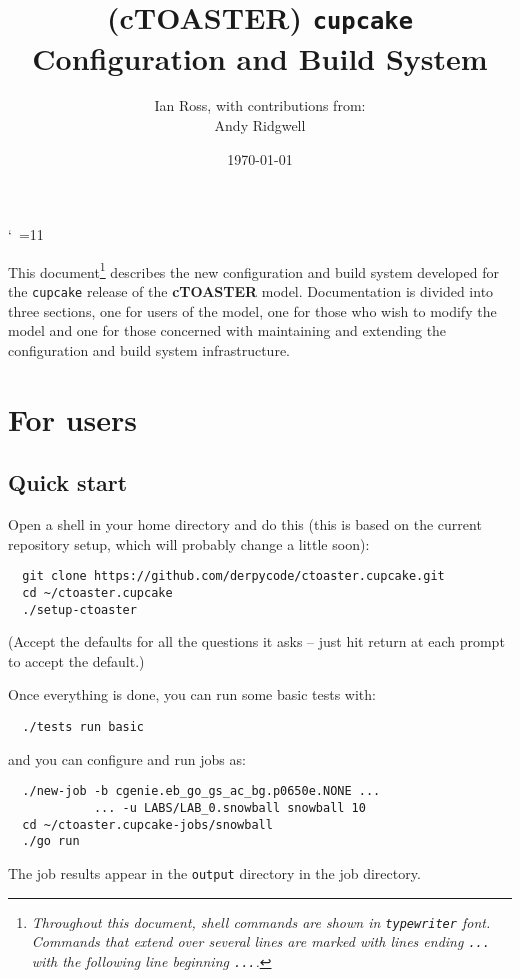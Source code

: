 \documentclass[a4paper,10pt,article]{memoir}
\title{(cTOASTER) \texttt{cupcake} Configuration and Build System}
\author{Ian Ross, with contributions from:\\Andy Ridgwell}
\date{\today}
\begin{document}
\catcode`~=11    %

\maketitle

\noindent This document\footnote{\emph{Throughout this document, shell commands are shown in 
\texttt{typewriter} font.  Commands that extend over several lines 
are marked with lines ending \texttt{...} with the following line 
beginning \texttt{...}.}}  describes the new configuration and build system 
developed for the \texttt{cupcake} release of the \textbf{cTOASTER} model. 
Documentation is divided into three sections, one for users of the 
model, one for those who wish to modify the model and one for those 
concerned with maintaining and extending the configuration and build 
system infrastructure.

\chapter{For users}

\section{Quick start}

Open a shell in your home directory and do this (this is based on the current repository setup, which will probably change a little soon):
\begin{verbatim}
  git clone https://github.com/derpycode/ctoaster.cupcake.git
  cd ~/ctoaster.cupcake
  ./setup-ctoaster
\end{verbatim}
(Accept the defaults for all the questions it asks -- just hit return at each prompt to accept the default.)

\noindent Once everything is done, you can run some basic tests with:
\begin{verbatim}
  ./tests run basic
\end{verbatim}
and you can configure and run jobs as:
\begin{verbatim}
  ./new-job -b cgenie.eb_go_gs_ac_bg.p0650e.NONE ...
            ... -u LABS/LAB_0.snowball snowball 10
  cd ~/ctoaster.cupcake-jobs/snowball
  ./go run
\end{verbatim}
The job results appear in the \texttt{output} directory in the job
directory.
\end{document}
